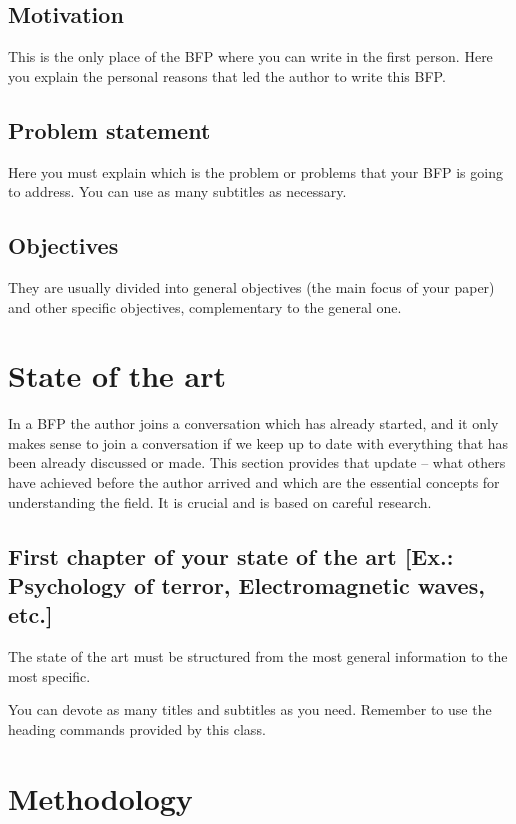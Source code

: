 \documentclass[english]{utad-tfg}
\begin{document}
\section{Motivation}
This is the only place of the BFP where you can write in the first person.
Here you explain the personal reasons that led the author to write this BFP.

\section{Problem statement}
Here you must explain which is the problem or problems that your BFP is
going to address. You can use as many subtitles as necessary.

\section{Objectives}
They are usually divided into general objectives (the main focus of your
paper) and other specific objectives, complementary to the general one.

\chapter{State of the art}

In a BFP the author joins a conversation which has already started, and it
only makes sense to join a conversation if we keep up to date with
everything that has been already discussed or made. This section provides
that update -- what others have achieved before the author arrived and
which are the essential concepts for understanding the field. It is crucial
and is based on careful research.

\section{First chapter of your state of the art [Ex.: Psychology of terror,
Electromagnetic waves, etc.]}
The state of the art must be structured from the most general information
to the most specific.

You can devote as many titles and subtitles as you need. Remember to use the heading commands provided by this class.

\chapter{Methodology}
\end{document}
